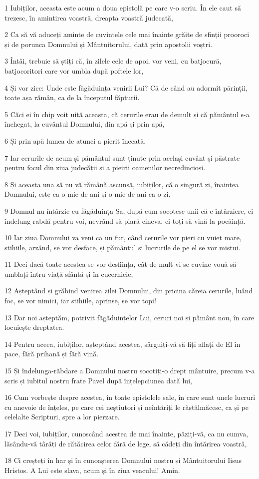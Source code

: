 \par 1 Iubiților, aceasta este acum a doua epistolă pe care v-o scriu. În ele caut să trezesc, în amintirea voastră, dreapta voastră judecată,
\par 2 Ca să vă aduceți aminte de cuvintele cele mai înainte grăite de sfinții prooroci și de porunca Domnului și Mântuitorului, dată prin apostolii voștri.
\par 3 Întâi, trebuie să știți că, în zilele cele de apoi, vor veni, cu batjocură, batjocoritori care vor umbla după poftele lor,
\par 4 Și vor zice: Unde este făgăduința venirii Lui? Că de când au adormit părinții, toate așa rămân, ca de la începutul făpturii.
\par 5 Căci ei în chip voit uită aceasta, că cerurile erau de demult și că pământul s-a închegat, la cuvântul Domnului, din apă și prin apă,
\par 6 Și prin apă lumea de atunci a pierit înecată,
\par 7 Iar cerurile de acum și pământul sunt ținute prin același cuvânt și păstrate pentru focul din ziua judecății și a pieirii oamenilor necredincioși.
\par 8 Și aceasta una să nu vă rămână ascunsă, iubiților, că o singură zi, înaintea Domnului, este ca o mie de ani și o mie de ani ca o zi.
\par 9 Domnul nu întârzie cu făgăduința Sa, după cum socotesc unii că e întârziere, ci îndelung rabdă pentru voi, nevrând să piară cineva, ci toți să vină la pocăință.
\par 10 Iar ziua Domnului va veni ca un fur, când cerurile vor pieri cu vuiet mare, stihiile, arzând, se vor desface, și pământul și lucrurile de pe el se vor mistui.
\par 11 Deci dacă toate acestea se vor desființa, cât de mult vi se cuvine vouă să umblați întru viață sfântă și în cucernicie,
\par 12 Așteptând și grăbind venirea zilei Domnului, din pricina căreia cerurile, luând foc, se vor nimici, iar stihiile, aprinse, se vor topi!
\par 13 Dar noi așteptăm, potrivit făgăduințelor Lui, ceruri noi și pământ nou, în care locuiește dreptatea.
\par 14 Pentru aceea, iubiților, așteptând acestea, sârguiți-vă să fiți aflați de El în pace, fără prihană și fără vină.
\par 15 Și îndelunga-răbdare a Domnului nostru socotiți-o drept mântuire, precum v-a scris și iubitul nostru frate Pavel după înțelepciunea dată lui,
\par 16 Cum vorbește despre acestea, în toate epistolele sale, în care sunt unele lucruri cu anevoie de înțeles, pe care cei neștiutori și neîntăriți le răstălmăcesc, ca și pe celelalte Scripturi, spre a lor pierzare.
\par 17 Deci voi, iubiților, cunoscând acestea de mai înainte, păziți-vă, ca nu cumva, lăsându-vă târâți de rătăcirea celor fără de lege, să cădeți din întărirea voastră,
\par 18 Ci creșteți în har și în cunoașterea Domnului nostru și Mântuitorului Iisus Hristos. A Lui este slava, acum și în ziua veacului! Amin.



